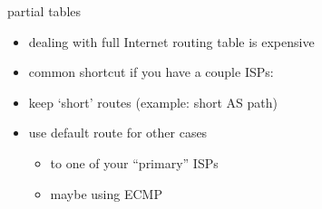 \begin{frame}{partial tables}
    \begin{itemize}
    \item dealing with full Internet routing table is expensive
    \vspace{.5cm}
    \item common shortcut if you have a couple ISPs:
    \item keep `short' routes (example: short AS path)
    \item use default route for other cases
        \begin{itemize}
        \item to one of your ``primary'' ISPs
        \item maybe using ECMP
        \end{itemize}
    \end{itemize}
\end{frame}
